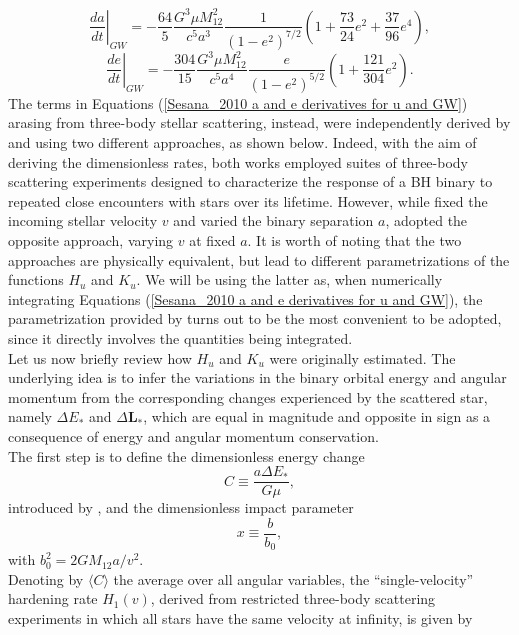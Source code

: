 \documentclass[12pt,twoside,openany]{book}
\begin{document}
\begin{equation}
    \left.\frac{da}{dt}\right|_{GW} = -\frac{64}{5} \frac{G^3 \mu M_{12}^2}{c^5 a^3} \frac{1}{(1 - e^2)^{7/2}} \left( 1 + \frac{73}{24}e^2 + \frac{37}{96}e^4 \right),
\end{equation}
\begin{equation}
    \left.\frac{de}{dt}\right|_{GW} = -\frac{304}{15} \frac{G^3 \mu M_{12}^2}{c^5 a^4}  \frac{e}{(1 - e^2)^{5/2}} \left( 1 + \frac{121}{304}e^2 \right).
\end{equation}
The terms in Equations (\ref{Sesana_2010 a and e derivatives for u and GW}) arasing from three-body stellar scattering, instead, were independently derived by \textcite{Quinlan_1996} and \textcite{Sesana_2006} using two different approaches, as shown below. Indeed, with the aim of deriving the dimensionless rates, both works employed suites of three-body scattering experiments designed to characterize the response of a BH binary to repeated close encounters with stars over its lifetime. However, while \textcite{Quinlan_1996} fixed the incoming stellar velocity $v$ and varied the binary separation $a$, \textcite{Sesana_2006} adopted the opposite approach, varying $v$ at fixed $a$. It is worth of noting that the two approaches are physically equivalent, but lead to different parametrizations of the functions $H_u$ and $K_u$. We will be using the latter as, when numerically integrating Equations (\ref{Sesana_2010 a and e derivatives for u and GW}), the parametrization provided by \textcite{Sesana_2006} turns out to be the most convenient to be adopted, since it directly involves the quantities being integrated.\\Let us now briefly review how $H_u$ and $K_u$ were originally estimated. The underlying idea is to infer the variations in the binary orbital energy and angular momentum from the corresponding changes experienced by the scattered star, namely $\Delta E_*$ and $\Delta \mathbf{L_*}$, which are equal in magnitude and opposite in sign as a consequence of energy and angular momentum conservation.\\The first step is to define the dimensionless energy change
\begin{equation}\label{C quinlan}
    C\equiv\frac{a\Delta E_*}{G\mu},
\end{equation}
introduced by \textcite{Hills_1983}, and the dimensionless impact parameter
\begin{equation}
 x\equiv \frac{b}{b_0},
\end{equation}
with $b_0^2=2GM_{12}a/v^2$.\\Denoting by $\langle C\rangle$ the average over all angular variables, the “single-velocity” hardening rate $H_1(v)$, derived from restricted three-body scattering experiments in which all stars have the same velocity at infinity, is given by
\end{document}
